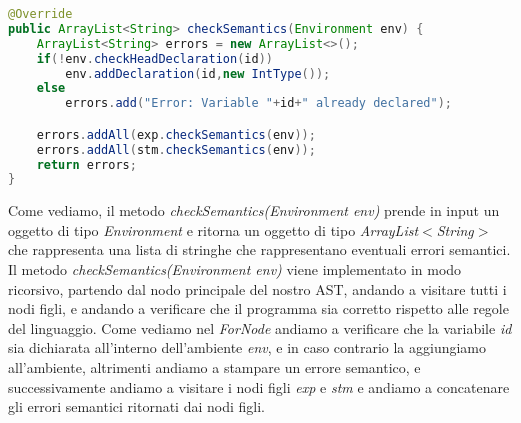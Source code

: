\documentclass[../../main.tex]{subfiles}
\begin{document}
\begin{lstlisting}[language=Java, caption={Controllo semantico di ForNode}]
@Override
public ArrayList<String> checkSemantics(Environment env) {
    ArrayList<String> errors = new ArrayList<>();
    if(!env.checkHeadDeclaration(id))
        env.addDeclaration(id,new IntType());
    else
        errors.add("Error: Variable "+id+" already declared");

    errors.addAll(exp.checkSemantics(env));
    errors.addAll(stm.checkSemantics(env));
    return errors;
}
\end{lstlisting}
Come vediamo, il metodo \textit{checkSemantics(Environment env)} prende in input un oggetto di tipo \textit{Environment} e ritorna un oggetto di tipo \textit{ArrayList$<$String$>$} che rappresenta una lista di stringhe che rappresentano eventuali errori semantici.
Il metodo \textit{checkSemantics(Environment env)} viene implementato in modo ricorsivo, partendo dal nodo principale del nostro AST, andando a visitare tutti i nodi figli, e andando a verificare che il programma sia corretto rispetto alle regole del linguaggio.
Come vediamo nel \textit{ForNode} andiamo a verificare che la variabile \textit{id} sia dichiarata all'interno dell'ambiente \textit{env}, e in caso contrario la aggiungiamo all'ambiente, altrimenti andiamo a stampare un errore semantico, e successivamente andiamo a visitare i nodi figli \textit{exp} e \textit{stm} e andiamo a concatenare gli errori semantici ritornati dai nodi figli.
\end{document}
